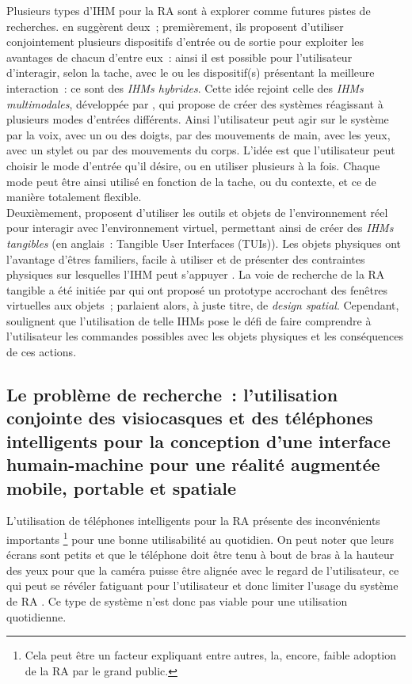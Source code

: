 Plusieurs types d'IHM pour la RA sont à explorer comme futures pistes de recherches. \citet{AzumaBaillotBehringerEtAl2001} en suggèrent deux~; premièrement, ils proposent d'utiliser conjointement plusieurs dispositifs d'entrée ou de sortie pour exploiter les avantages de chacun d'entre eux~: ainsi il est possible pour l'utilisateur d'interagir, selon la tache, avec le ou les dispositif(s) présentant la meilleure interaction~: ce sont des \emph{IHMs hybrides}. \citep{ZhouDuhBillinghurst2008}  Cette idée rejoint celle des \emph{IHMs multimodales}, développée par \citet{Oviatt2003}, qui propose de créer des systèmes réagissant à plusieurs modes d'entrées différents. Ainsi l'utilisateur peut agir sur le système par la voix, avec un ou des doigts, par des mouvements de main, avec les yeux, avec un stylet ou par des mouvements du corps. L'idée est que l'utilisateur peut choisir le mode d'entrée qu'il désire, ou en utiliser plusieurs à la fois. Chaque mode peut être ainsi utilisé en fonction de la tache, ou du contexte, et ce de manière totalement flexible. \citep{CarmignianiFurhtAnisettiEtAl2011} \\
Deuxièmement, \citet{AzumaBaillotBehringerEtAl2001} proposent d'utiliser les outils et objets de l'environnement réel pour interagir avec l'environnement virtuel, permettant ainsi de créer des \emph{IHMs tangibles} (en anglais~: \foreignlanguage{english}{Tangible User Interfaces (TUIs)}). Les objets physiques ont l'avantage d'êtres familiers, facile à utiliser et de présenter des contraintes physiques sur lesquelles l'IHM peut s'appuyer \citep{ZhouDuhBillinghurst2008}. La voie de recherche de la RA tangible a été initiée par \citet{FeinerMacIntyreHauptEtAl1993} qui ont proposé un prototype accrochant des fenêtres virtuelles aux objets~; \citeauthor{FeinerMacIntyreHauptEtAl1993} parlaient alors, à juste titre, de \emph{design spatial}. Cependant, \citeauthor{ZhouDuhBillinghurst2008} soulignent que l'utilisation de telle IHMs pose le défi de faire comprendre à l'utilisateur les commandes possibles avec les objets physiques et les conséquences de ces actions.


\subsection*{Le problème de recherche~: l'utilisation conjointe des visiocasques et des téléphones intelligents pour la conception d'une interface humain-machine pour une réalité augmentée mobile, portable et spatiale}
L'utilisation de téléphones intelligents pour la RA présente des inconvénients importants \footnote{Cela peut être un facteur expliquant entre autres, la, encore, faible adoption de la RA par le grand public.} pour une bonne utilisabilité au quotidien. On peut noter que leurs écrans sont petits \citep{DeSaChurchill2013} et que le téléphone doit être tenu à bout de bras à la hauteur des yeux pour que la caméra puisse être alignée avec le regard de l'utilisateur, ce qui peut se révéler fatiguant pour l'utilisateur et donc limiter l'usage du système de RA \citep{Hincapie-RamosGuoMoghadasianEtAl2014}. Ce type de système n'est donc pas viable pour une utilisation quotidienne.

